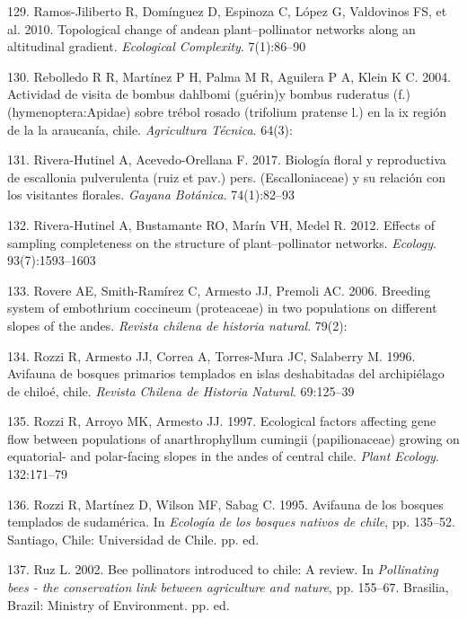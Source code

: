 \documentclass[
]{article}
\begin{document}
\leavevmode\hypertarget{ref-RN152}{}%
129. Ramos-Jiliberto R, Domínguez D, Espinoza C, López G, Valdovinos FS,
et al. 2010. Topological change of andean plant--pollinator networks
along an altitudinal gradient. \emph{Ecological Complexity}. 7(1):86--90

\leavevmode\hypertarget{ref-RN62}{}%
130. Rebolledo R R, Martínez P H, Palma M R, Aguilera P A, Klein K C.
2004. Actividad de visita de bombus dahlbomi (guérin)y bombus ruderatus
(f.) (hymenoptera:Apidae) sobre trébol rosado (trifolium pratense l.) en
la ix región de la la araucanía, chile. \emph{Agricultura Técnica}.
64(3):

\leavevmode\hypertarget{ref-RN63}{}%
131. Rivera-Hutinel A, Acevedo-Orellana F. 2017. Biología floral y
reproductiva de escallonia pulverulenta (ruiz et pav.) pers.
(Escalloniaceae) y su relación con los visitantes florales. \emph{Gayana
Botánica}. 74(1):82--93

\leavevmode\hypertarget{ref-RN153}{}%
132. Rivera-Hutinel A, Bustamante RO, Marín VH, Medel R. 2012. Effects
of sampling completeness on the structure of plant--pollinator networks.
\emph{Ecology}. 93(7):1593--1603

\leavevmode\hypertarget{ref-RN64}{}%
133. Rovere AE, Smith-Ramírez C, Armesto JJ, Premoli AC. 2006. Breeding
system of embothrium coccineum (proteaceae) in two populations on
different slopes of the andes. \emph{Revista chilena de historia
natural}. 79(2):

\leavevmode\hypertarget{ref-RN91}{}%
134. Rozzi R, Armesto JJ, Correa A, Torres-Mura JC, Salaberry M. 1996.
Avifauna de bosques primarios templados en islas deshabitadas del
archipiélago de chiloé, chile. \emph{Revista Chilena de Historia
Natural}. 69:125--39

\leavevmode\hypertarget{ref-RN154}{}%
135. Rozzi R, Arroyo MK, Armesto JJ. 1997. Ecological factors affecting
gene ﬂow between populations of anarthrophyllum cumingii (papilionaceae)
growing on equatorial- and polar-facing slopes in the andes of central
chile. \emph{Plant Ecology}. 132:171--79

\leavevmode\hypertarget{ref-RN90}{}%
136. Rozzi R, Martínez D, Wilson MF, Sabag C. 1995. Avifauna de los
bosques templados de sudamérica. In \emph{Ecología de los bosques
nativos de chile}, pp. 135--52. Santiago, Chile: Universidad de Chile.
pp. ed.

\leavevmode\hypertarget{ref-RN65}{}%
137. Ruz L. 2002. Bee pollinators introduced to chile: A review. In
\emph{Pollinating bees - the conservation link between agriculture and
nature}, pp. 155--67. Brasilia, Brazil: Ministry of Environment. pp. ed.
\end{document}

